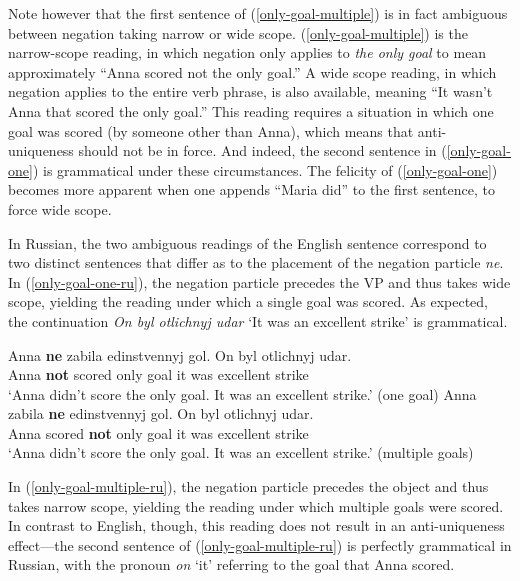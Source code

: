 \documentclass{article}
\begin{document}
Note however that the first sentence of (\ref{only-goal-multiple}) is in fact ambiguous between negation taking narrow or wide scope. (\ref{only-goal-multiple}) is the narrow-scope reading, in which negation only applies to \textit{the only goal} to mean approximately ``Anna scored not the only goal.'' A wide scope reading, in which negation applies to the entire verb phrase, is also available, meaning ``It wasn't Anna that scored the only goal.'' This reading requires a situation in which one goal was scored (by someone other than Anna), which means that anti-uniqueness should not be in force. And indeed, the second sentence in (\ref{only-goal-one}) is grammatical under these circumstances. The felicity of (\ref{only-goal-one}) becomes more apparent when one appends ``Maria did'' to the first sentence, to force wide scope.

In Russian, the two ambiguous readings of the English sentence correspond to two distinct sentences that differ as to the placement of the negation particle \textit{ne}. In (\ref{only-goal-one-ru}), the negation particle precedes the VP and thus takes wide scope, yielding the reading under which a single goal was scored. As expected, the continuation \textit{On byl otlichnyj udar} `It was an excellent strike' is grammatical.

\begin{exe}
	\ex \label{only-goal-one-ru} \gll Anna \textbf{ne} zabila edinstvennyj gol. On byl otlichnyj udar.\\
	Anna \textbf{not} scored only goal it was excellent strike\\
	\glt `Anna didn't score the only goal. It was an excellent strike.' (one goal)
	\ex \label{only-goal-multiple-ru} \gll Anna zabila \textbf{ne} edinstvennyj gol. On byl otlichnyj udar.\\
	Anna scored \textbf{not} only goal it was excellent strike\\
	\glt `Anna didn't score the only goal. It was an excellent strike.' (multiple goals)
\end{exe}

In (\ref{only-goal-multiple-ru}), the negation particle precedes the object and thus takes narrow scope, yielding the reading under which multiple goals were scored. In contrast to English, though, this reading does not result in an anti-uniqueness effect---the second sentence of (\ref{only-goal-multiple-ru}) is perfectly grammatical in Russian, with the pronoun \textit{on} `it' referring to the goal that Anna scored.
\end{document}
